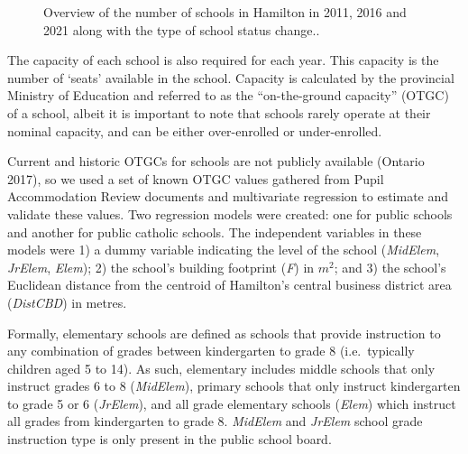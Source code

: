 \documentclass[
default
]{sn-jnl}
\begin{document}
\begin{figure}


\caption{\label{fig-Fig1}Overview of the number of schools in Hamilton
in 2011, 2016 and 2021 along with the type of school status change..}

\end{figure}%

The capacity of each school is also required for each year. This
capacity is the number of `seats' available in the school. Capacity is
calculated by the provincial Ministry of Education and referred to as
the ``on-the-ground capacity'' (OTGC) of a school, albeit it is
important to note that schools rarely operate at their nominal capacity,
and can be either over-enrolled or under-enrolled.

Current and historic OTGCs for schools are not publicly available
(Ontario 2017), so we used a set of known OTGC values gathered from
Pupil Accommodation Review documents and multivariate regression to
estimate and validate these values. Two regression models were created:
one for public schools and another for public catholic schools. The
independent variables in these models were 1) a dummy variable
indicating the level of the school (\emph{MidElem}, \emph{JrElem},
\emph{Elem}); 2) the school's building footprint (\emph{F}) in \(m^2\);
and 3) the school's Euclidean distance from the centroid of Hamilton's
central business district area (\emph{DistCBD}) in metres.

Formally, elementary schools are defined as schools that provide
instruction to any combination of grades between kindergarten to grade 8
(i.e.~typically children aged 5 to 14). As such, elementary includes
middle schools that only instruct grades 6 to 8 (\emph{MidElem}),
primary schools that only instruct kindergarten to grade 5 or 6
(\emph{JrElem}), and all grade elementary schools (\emph{Elem}) which
instruct all grades from kindergarten to grade 8. \emph{MidElem} and
\emph{JrElem} school grade instruction type is only present in the
public school board.
\end{document}
